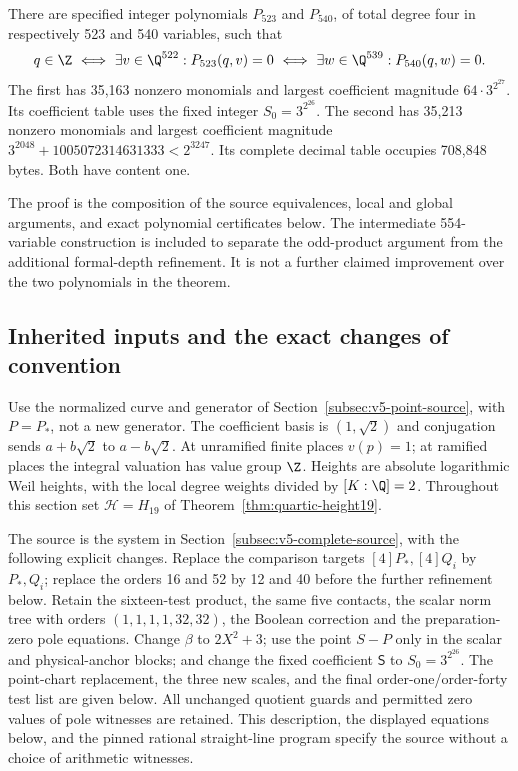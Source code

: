\begin{theorem}\label{thm:v9-quartics}
There are specified integer polynomials $P_{523}$ and $P_{540}$, of total
degree four in respectively 523 and 540 variables, such that
\[
 q\in\Z\ \Longleftrightarrow\ \exists v\in\Q^{522}:P_{523}(q,v)=0
 \ \Longleftrightarrow\ \exists w\in\Q^{539}:P_{540}(q,w)=0.
\]
The first has 35,163 nonzero monomials and largest coefficient magnitude
$64\cdot3^{2^{27}}$. Its coefficient table uses the fixed integer
$S_0=3^{2^{26}}$. The second has 35,213 nonzero monomials and largest
coefficient magnitude $3^{2048}+1005072314631333<2^{3247}$.
Its complete decimal table occupies 708,848 bytes. Both have content one.
\end{theorem}

The proof is the composition of the source equivalences, local and global
arguments, and exact polynomial certificates below. The intermediate
554-variable construction is included to separate the odd-product
argument from the additional formal-depth refinement. It is not a further
claimed improvement over the two polynomials in the theorem.

\subsection{Inherited inputs and the exact changes of convention}\label{subsec:v9-inputs}

Use the normalized curve and generator of
Section~\ref{subsec:v5-point-source}, with $P=P_*$, not a new generator.
The coefficient basis is $(1,\sqrt2)$ and conjugation sends
$a+b\sqrt2$ to $a-b\sqrt2$. At unramified finite places $v(p)=1$;
at ramified places the integral valuation has value group $\Z$.
Heights are absolute logarithmic Weil heights, with the local degree
weights divided by $[K:\Q]=2$. Throughout this section set
$\mathcal H=H_{19}$ of Theorem~\ref{thm:quartic-height19}.

The source is the system in Section~\ref{subsec:v5-complete-source},
with the following explicit changes. Replace the comparison targets
$[4]P_*,[4]Q_i$ by $P_*,Q_i$; replace the orders 16 and 52 by 12 and 40
before the further refinement below. Retain the sixteen-test product,
the same five contacts, the scalar norm tree with orders $(1,1,1,1,32,32)$,
the Boolean correction and the preparation-zero pole equations.
Change $\beta$ to $2X^2+3$; use the point $S-P$ only in the scalar and
physical-anchor blocks; and change the fixed coefficient $\mathsf S$
to $S_0=3^{2^{26}}$. The point-chart replacement, the three new scales,
and the final order-one/order-forty test list are given below. All
unchanged quotient guards and permitted zero values of pole witnesses
are retained. This description, the displayed equations below, and the
pinned rational straight-line program specify the source without a
choice of arithmetic witnesses.

